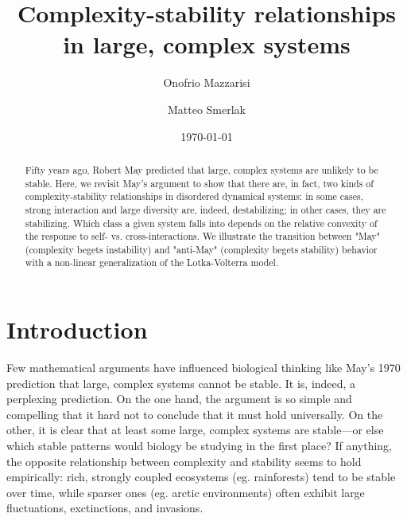 \documentclass[%
 reprint,
 amsmath,amssymb,
 aps,
]{revtex4-2}
\begin{document}
\title{Complexity-stability relationships in large, complex systems}

\author{Onofrio Mazzarisi}
\author{Matteo Smerlak}



\date{\today}%

\begin{abstract}
Fifty years ago, Robert May predicted that large, complex systems are unlikely to be stable. Here, we revisit May's argument to show that there are, in fact, two kinds of complexity-stability relationships in disordered dynamical systems: in some cases, strong interaction and large diversity are, indeed, destabilizing; in other cases, they are stabilizing. Which class a given system falls into depends on the relative convexity of the response to self- vs. cross-interactions. We illustrate the transition between "May" (complexity begets instability) and "anti-May" (complexity begets stability) behavior with a non-linear  generalization of the Lotka-Volterra model. 
\end{abstract}


\maketitle

\section{Introduction}

Few mathematical arguments have influenced biological thinking like May's 1970 prediction that large, complex systems cannot be stable. It is, indeed, a perplexing prediction. On the one hand, the argument is so simple and compelling that it hard not to conclude that it must hold universally. On the other, it is clear that at least some large, complex systems are stable---or else which stable patterns would biology be studying in the first place? If anything, the opposite relationship between complexity and stability seems to hold empirically: rich, strongly coupled ecosystems (eg. rainforests) tend to be  stable over time, while sparser ones (eg. arctic environments) often exhibit large fluctuations, exctinctions, and invasions. 
\end{document}

